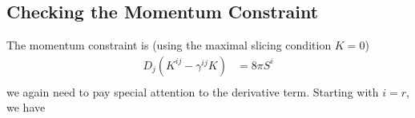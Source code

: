 \documentclass[12pt]{article}
\numberwithin{equation}{section}
\begin{document}
\subsection{Checking the Momentum Constraint}
The momentum constraint is (using the maximal slicing condition $K = 0$)
\begin{equation}
\begin{aligned}
D_j (K^{ij} - \gamma^{ij} K) &= 8 \pi S^i \\
\end{aligned}
\end{equation}
we again need to pay special attention to the derivative term.  Starting with $i = r$, we have
\end{document}
